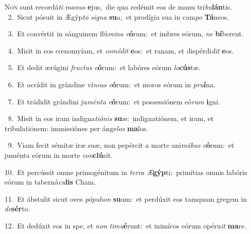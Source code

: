 \lettrine{\initial\textcolor{\initialcolor}{N}}{on} sunt recordá\textit{ti} \textit{ma}\-\textit{nus} \textbf{e}\-jus,~\star die qua redémit eos de manu tri\-\textit{bu}\-\textbf{lán}tis.\\
{\numbfont\textcolor{\numbcolor}{~2.}}~Sicut pósuit in Ægýp\textit{to} \textit{si}\-\textit{gna} \textbf{su}\-a,~\star et prodígia sua in cam\textit{po} \textbf{Tá}\-neos.\par
{\numbfont\textcolor{\numbcolor}{~3.}}~Et convértit in sánguinem flú\-\textit{mi}\-\textit{na} \textit{e}\-\textbf{ó}rum:~\star et imbres eórum, \textit{ne} \textbf{bí}\-berent.\par
{\numbfont\textcolor{\numbcolor}{~4.}}~Misit in eos cœnomyíam, et \textit{com}\-\textit{é}\textit{dit} \textbf{e}\-os:~\star et ranam, et dispérdi\textit{dit} \textbf{e}\-os.\par
{\numbfont\textcolor{\numbcolor}{~5.}}~Et dedit ærúgini \textit{fruc}\-\textit{tus} \textit{e}\-\textbf{ó}rum:~\star et labóres eórum \textit{lo}\-\textbf{cús}tæ.\par
{\numbfont\textcolor{\numbcolor}{~6.}}~Et occídit in grándine ví\-\textit{ne}\-\textit{as} \textit{e}\-\textbf{ó}rum:~\star et moros eórum in \textit{pru}\-\textbf{í}na.\par
{\numbfont\textcolor{\numbcolor}{~7.}}~Et trádidit grándini ju\-\textit{mén}\-\textit{ta} \textit{e}\-\textbf{ó}rum:~\star et possessiónem eó\textit{rum} \textbf{i}\-gni.\par
{\numbfont\textcolor{\numbcolor}{~8.}}~Misit in eos iram indigna\-\textit{ti}\-\textit{ó}\textit{nis} \textbf{su}\-æ:~\star indignatiónem, et iram, et tribulatiónem: immissiónes per ánge\textit{los} \textbf{ma}\-los.\par
{\numbfont\textcolor{\numbcolor}{~9.}}~Viam fecit sémitæ iræ suæ, non pepércit a morte ani\-\textit{má}\-\textit{bus} \textit{e}\-\textbf{ó}rum:~\star et juménta eórum in morte \textit{con}\-\textbf{clú}sit.\par
{\numbfont\textcolor{\numbcolor}{10.}}~Et percússit omne primogénitum in \textit{ter}\-\textit{ra} \textit{Æ}\-\textbf{gýp}ti:~\star primítias omnis labóris eórum in taberná\-\textit{cu}\-\textbf{lis} Cham.\par
{\numbfont\textcolor{\numbcolor}{11.}}~Et ábstulit sicut oves \textit{pó}\-\textit{pu}\textit{lum} \textbf{su}\-um:~\star et perdúxit eos tamquam gregem in \textit{de}\-\textbf{sér}to.\par
{\numbfont\textcolor{\numbcolor}{12.}}~Et dedúxit eos in spe, et \textit{non} \textit{ti}\-\textit{mu}\textbf{é}runt:~\star et inimícos eórum opéru\textit{it} \textbf{ma}\-re.\par
